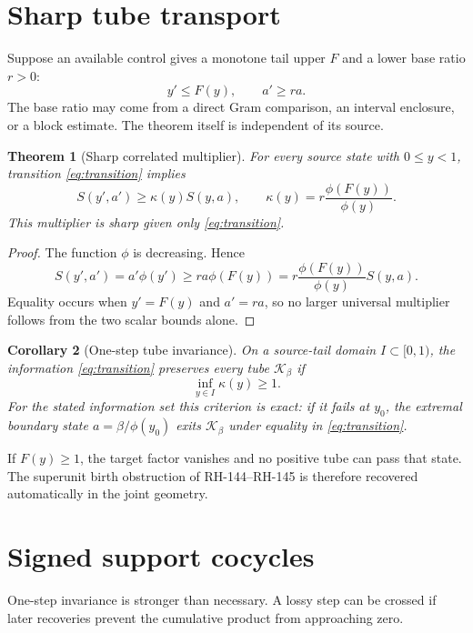 \documentclass[12pt]{article}
\newtheorem{theorem}{Theorem}
\newtheorem{corollary}[theorem]{Corollary}
\begin{document}
\section{Sharp tube transport}
Suppose an available control gives a monotone tail upper $F$ and a lower
base ratio $r>0$:
\begin{equation}\label{eq:transition}
 y'\leq F(y),
 \qquad
 a'\geq r a.
\end{equation}
The base ratio may come from a direct Gram comparison, an interval enclosure,
or a block estimate.  The theorem itself is independent of its source.

\begin{theorem}[Sharp correlated multiplier]\label{thm:multiplier}
For every source state with $0\leq y<1$, transition
\eqref{eq:transition} implies
\begin{equation}\label{eq:multiplier}
 S(y',a')\geq \kappa(y)S(y,a),
 \qquad
 \kappa(y)=r\frac{\phi(F(y))}{\phi(y)}.
\end{equation}
This multiplier is sharp given only \eqref{eq:transition}.
\end{theorem}
\begin{proof}
The function $\phi$ is decreasing.  Hence
\[
 S(y',a')=a'\phi(y')
 \geq ra\phi(F(y))
 =r\frac{\phi(F(y))}{\phi(y)}S(y,a).
\]
Equality occurs when $y'=F(y)$ and $a'=ra$, so no larger universal
multiplier follows from the two scalar bounds alone.
\end{proof}

\begin{corollary}[One-step tube invariance]
On a source-tail domain $I\subset[0,1)$, the information
\eqref{eq:transition} preserves every tube $\mathcal K_\beta$ if
\[
 \inf_{y\in I}\kappa(y)\geq1.
\]
For the stated information set this criterion is exact: if it fails at
$y_0$, the extremal boundary state
$a=\beta/\phi(y_0)$ exits $\mathcal K_\beta$ under equality in
\eqref{eq:transition}.
\end{corollary}

If $F(y)\geq1$, the target factor vanishes and no positive tube can pass that
state.  The superunit birth obstruction of RH-144--RH-145 is therefore
recovered automatically in the joint geometry.

\section{Signed support cocycles}
One-step invariance is stronger than necessary.  A lossy step can be crossed
if later recoveries prevent the cumulative product from approaching zero.
\end{document}
